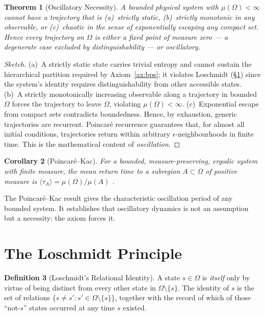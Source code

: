 \documentclass[11pt,a4paper]{article}
\newtheorem{theorem}{Theorem}[section]
\newtheorem{corollary}[theorem]{Corollary}
\theoremstyle{definition}
\newtheorem{definition}[theorem]{Definition}
\theoremstyle{remark}
\begin{document}
\begin{theorem}[Oscillatory Necessity]
\label{thm:oscnec}
A bounded physical system with $\mu(\Omega) < \infty$ cannot have a trajectory that is (a)~strictly static, (b)~strictly monotonic in any observable, or (c)~chaotic in the sense of exponentially escaping any compact set. Hence every trajectory on $\Omega$ is either a fixed point of measure zero --- a degenerate case excluded by distinguishability --- or oscillatory.
\end{theorem}

\begin{proof}[Sketch]
(a)~A strictly static state carries trivial entropy and cannot sustain the hierarchical partition required by Axiom~\ref{ax:bps}; it violates Loschmidt (\S\ref{sec:loschmidt}) since the system's identity requires distinguishability from other accessible states. (b)~A strictly monotonically increasing observable along a trajectory in bounded $\Omega$ forces the trajectory to leave $\Omega$, violating $\mu(\Omega) < \infty$. (c)~Exponential escape from compact sets contradicts boundedness. Hence, by exhaustion, generic trajectories are recurrent. Poincar\'e recurrence \citep{poincare1890} guarantees that, for almost all initial conditions, trajectories return within arbitrary $\epsilon$-neighbourhoods in finite time. This is the mathematical content of \emph{oscillation}.
\end{proof}

\begin{corollary}[Poincar\'e--Kac]
For a bounded, measure-preserving, ergodic system with finite measure, the mean return time to a subregion $A \subset \Omega$ of positive measure is $\langle \tau_A \rangle = \mu(\Omega)/\mu(A)$ \citep{kac1947}.
\end{corollary}

The Poincar\'e--Kac result gives the characteristic oscillation period of any bounded system. It establishes that oscillatory dynamics is not an assumption but a necessity: the axiom forces it.

\section{The Loschmidt Principle}
\label{sec:loschmidt}

\begin{definition}[Loschmidt's Relational Identity]
\label{def:loschmidt}
A state $s \in \Omega$ is \emph{itself} only by virtue of being distinct from every other state in $\Omega \setminus \{s\}$. The identity of $s$ is the set of relations $\{s \neq s' : s' \in \Omega \setminus \{s\}\}$, together with the record of which of those ``not-$s$'' states occurred at any time $s$ existed.
\end{definition}
\end{document}
